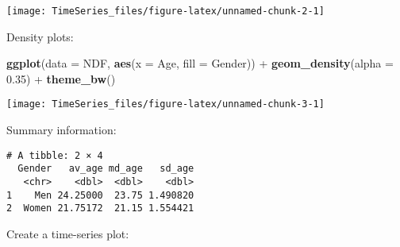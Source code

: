 \documentclass[]{article}
\newenvironment{Shaded}{\begin{snugshade}}{\end{snugshade}}
\newcommand{\KeywordTok}[1]{\textcolor[rgb]{0.13,0.29,0.53}{\textbf{{#1}}}}
\newcommand{\DataTypeTok}[1]{\textcolor[rgb]{0.13,0.29,0.53}{{#1}}}
\newcommand{\FloatTok}[1]{\textcolor[rgb]{0.00,0.00,0.81}{{#1}}}
\newcommand{\StringTok}[1]{\textcolor[rgb]{0.31,0.60,0.02}{{#1}}}
\newcommand{\NormalTok}[1]{{#1}}
\begin{document}
\begin{center}\texttt{[image: TimeSeries\_files/figure-latex/unnamed-chunk-2-1]} \end{center}

Density plots:

\begin{Shaded}
\begin{Highlighting}[]
\KeywordTok{ggplot}\NormalTok{(}\DataTypeTok{data =} \NormalTok{NDF, }\KeywordTok{aes}\NormalTok{(}\DataTypeTok{x =} \NormalTok{Age, }\DataTypeTok{fill =} \NormalTok{Gender)) +}\StringTok{ }
\StringTok{  }\KeywordTok{geom_density}\NormalTok{(}\DataTypeTok{alpha =} \FloatTok{0.35}\NormalTok{) +}\StringTok{ }
\StringTok{  }\KeywordTok{theme_bw}\NormalTok{()}
\end{Highlighting}
\end{Shaded}

\begin{center}\texttt{[image: TimeSeries\_files/figure-latex/unnamed-chunk-3-1]} \end{center}

Summary information:

\begin{Shaded}
\end{Shaded}

\begin{verbatim}
# A tibble: 2 × 4
  Gender   av_age md_age   sd_age
   <chr>    <dbl>  <dbl>    <dbl>
1    Men 24.25000  23.75 1.490820
2  Women 21.75172  21.15 1.554421
\end{verbatim}

Create a time-series plot:
\end{document}
